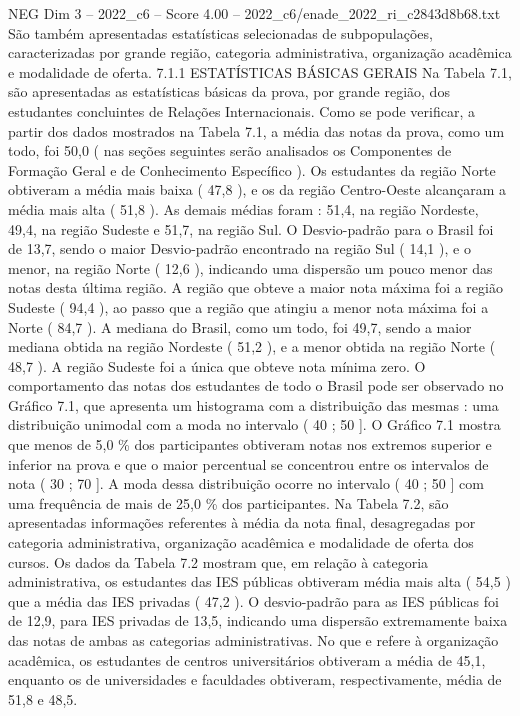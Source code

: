 \begin{textsample}{NEG Dim 3 – 2022\_c6 – Score 4.00 – 2022\_c6/enade\_2022\_ri\_c2843d8b68.txt}
São também apresentadas estatísticas selecionadas de subpopulações, caracterizadas por grande região, categoria administrativa, organização acadêmica e modalidade de oferta. 7.1.1 ESTATÍSTICAS BÁSICAS GERAIS Na Tabela 7.1, são apresentadas as estatísticas básicas da prova, por grande região, dos estudantes concluintes de Relações Internacionais.
Como se pode verificar, a partir dos dados mostrados na Tabela 7.1, a média das notas da prova, como um todo, foi 50,0 ( nas seções seguintes serão analisados os Componentes de Formação Geral e de Conhecimento Específico ).
Os estudantes da região Norte obtiveram a média mais baixa ( 47,8 ), e os da região Centro-Oeste alcançaram a média mais alta ( 51,8 ).
As demais médias foram : 51,4, na região Nordeste, 49,4, na região Sudeste e 51,7, na região Sul.
O Desvio-padrão para o Brasil foi de 13,7, sendo o maior Desvio-padrão encontrado na região Sul ( 14,1 ), e o menor, na região Norte ( 12,6 ), indicando uma dispersão um pouco menor das notas desta última região.
A região que obteve a maior nota máxima foi a região Sudeste ( 94,4 ), ao passo que a região que atingiu a menor nota máxima foi a Norte ( 84,7 ).
A mediana do Brasil, como um todo, foi 49,7, sendo a maior mediana obtida na região Nordeste ( 51,2 ), e a menor obtida na região Norte ( 48,7 ).
A região Sudeste foi a única que obteve nota mínima zero.
O comportamento das notas dos estudantes de todo o Brasil pode ser observado no Gráfico 7.1, que apresenta um histograma com a distribuição das mesmas : uma distribuição unimodal com a moda no intervalo ( 40 ; 50 ].
O Gráfico 7.1 mostra que menos de 5,0 \% dos participantes obtiveram notas nos extremos superior e inferior na prova e que o maior percentual se concentrou entre os intervalos de nota ( 30 ; 70 ].
A moda dessa distribuição ocorre no intervalo ( 40 ; 50 ] com uma frequência de mais de 25,0 \% dos participantes.
Na Tabela 7.2, são apresentadas informações referentes à média da nota final, desagregadas por categoria administrativa, organização acadêmica e modalidade de oferta dos cursos.
Os dados da Tabela 7.2 mostram que, em relação à categoria administrativa, os estudantes das IES públicas obtiveram média mais alta ( 54,5 ) que a média das IES privadas ( 47,2 ).
O desvio-padrão para as IES públicas foi de 12,9, para IES privadas de 13,5, indicando uma dispersão extremamente baixa das notas de ambas as categorias administrativas.
No que e refere à organização acadêmica, os estudantes de centros universitários obtiveram a média de 45,1, enquanto os de universidades e faculdades obtiveram, respectivamente, média de 51,8 e 48,5.

\end{textsample}
